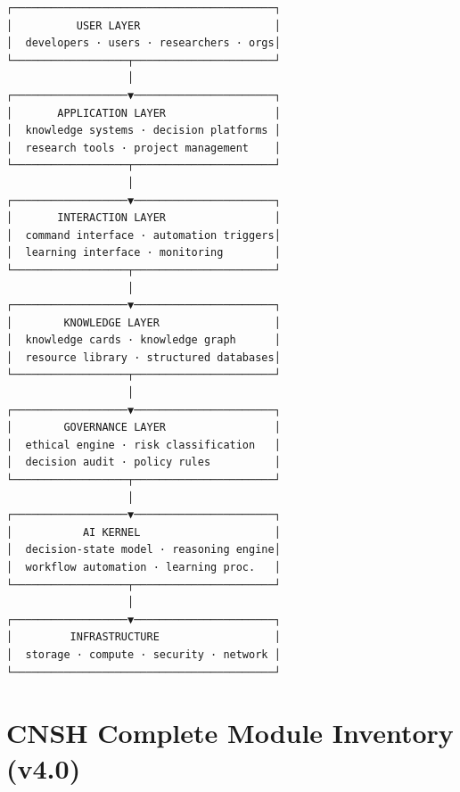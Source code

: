 \documentclass[conference]{IEEEtran}
\begin{document}
\begin{small}
\begin{verbatim}
┌─────────────────────────────────────────┐
│          USER LAYER                     │
│  developers · users · researchers · orgs│
└──────────────────┬──────────────────────┘
                   │
┌──────────────────▼──────────────────────┐
│       APPLICATION LAYER                 │
│  knowledge systems · decision platforms │
│  research tools · project management    │
└──────────────────┬──────────────────────┘
                   │
┌──────────────────▼──────────────────────┐
│       INTERACTION LAYER                 │
│  command interface · automation triggers│
│  learning interface · monitoring        │
└──────────────────┬──────────────────────┘
                   │
┌──────────────────▼──────────────────────┐
│        KNOWLEDGE LAYER                  │
│  knowledge cards · knowledge graph      │
│  resource library · structured databases│
└──────────────────┬──────────────────────┘
                   │
┌──────────────────▼──────────────────────┐
│        GOVERNANCE LAYER                 │
│  ethical engine · risk classification   │
│  decision audit · policy rules          │
└──────────────────┬──────────────────────┘
                   │
┌──────────────────▼──────────────────────┐
│           AI KERNEL                     │
│  decision-state model · reasoning engine│
│  workflow automation · learning proc.   │
└──────────────────┬──────────────────────┘
                   │
┌──────────────────▼──────────────────────┐
│         INFRASTRUCTURE                  │
│  storage · compute · security · network │
└─────────────────────────────────────────┘
\end{verbatim}
\end{small}

\section{CNSH Complete Module Inventory (v4.0)}
\end{document}

